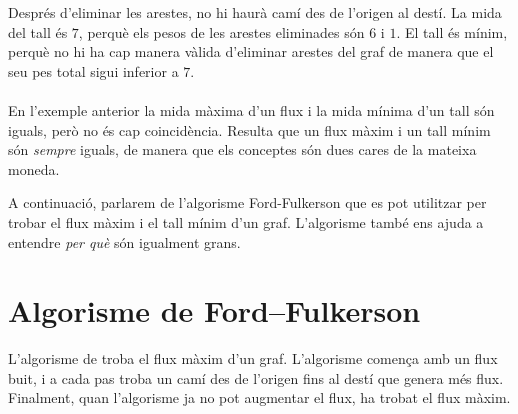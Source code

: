 \begin{center}
\end{center}


Després d'eliminar les arestes, no hi haurà camí des de l'origen al
destí. La mida del tall és $7$, perquè els pesos de les arestes
eliminades són $6$ i $1$. El tall és mínim, perquè no hi ha cap manera
vàlida d'eliminar arestes del graf de manera que el seu pes total
sigui inferior a $7$. \\\\ En l'exemple anterior la mida màxima d'un
flux i la mida mínima d'un tall són iguals, però no és cap
coincidència. Resulta que un flux màxim i un tall mínim són
\emph{sempre} iguals, de manera que els conceptes són dues cares de la
mateixa moneda.

A continuació, parlarem de l'algorisme Ford-Fulkerson que es pot
utilitzar per trobar el flux màxim i el tall mínim d'un
graf. L'algorisme també ens ajuda a entendre \emph{per què} són
igualment grans.

\section{Algorisme de Ford–Fulkerson}


L'algorisme de  \cite{for56} troba el flux màxim
d'un graf. L'algorisme comença amb un flux buit, i a cada pas troba un
camí des de l'origen fins al destí que genera més flux. Finalment,
quan l'algorisme ja no pot augmentar el flux, ha trobat el flux
màxim.

